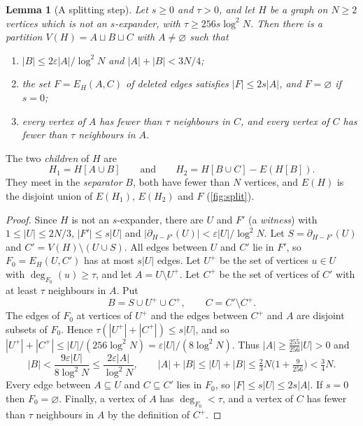 \documentclass[11pt]{article}
\newtheorem{lemma}[theorem]{Lemma}
\theoremstyle{definition}
\theoremstyle{remark}
\numberwithin{equation}{section}
\numberwithin{figure}{section}
\numberwithin{table}{section}
\newcommand{\eps}{\varepsilon}
\newcommand{\NN}{\partial}
\begin{document}
\begin{lemma}[A splitting step]\label{lem:split}
Let $s\ge0$ and $\tau>0$, and let $H$ be a graph on $N\ge2$ vertices which is
not an $s$-expander, with $\tau\ge256s\log^2N$. Then there is a partition
$V(H)=A\sqcup B\sqcup C$ with $A\ne\varnothing$ such that
\begin{enumerate}[label=\textup{(\roman*)},itemsep=1pt]
\item\label{it:split-shape} $|B|\le2\eps|A|/\log^2N$ and $|A|+|B|<3N/4$;
\item\label{it:split-del} the set $F=E_H(A,C)$ of \emph{deleted edges} satisfies
$|F|\le2s|A|$, and $F=\varnothing$ if $s=0$;
\item\label{it:split-thin} every vertex of $A$ has fewer than $\tau$ neighbours in
$C$, and every vertex of $C$ has fewer than $\tau$ neighbours in $A$.
\end{enumerate}
\end{lemma}

The two \emph{children} of $H$ are
\[
H_1=H[A\cup B]\qquad\text{and}\qquad H_2=H[B\cup C]-E(H[B]).
\]
They meet in the \emph{separator} $B$, both have fewer than $N$ vertices, and
$E(H)$ is the disjoint union of $E(H_1)$, $E(H_2)$ and $F$ (\cref{fig:split}).

\begin{proof}
Since $H$ is not an $s$-expander, there are $U$ and $F'$ (a \emph{witness}) with $1\le|U|\le2N/3$,
$|F'|\le s|U|$ and
$|\NN_{H-F'}(U)|<\eps|U|/\log^2N$. Let $S=\NN_{H-F'}(U)$ and
$C'=V(H)\setminus(U\cup S)$. All edges between $U$ and $C'$ lie in $F'$, so
$F_0=E_H(U,C')$ has at most $s|U|$ edges. Let $U^+$ be the set of vertices
$u\in U$ with $\deg_{F_0}(u)\ge\tau$, and let $A=U\setminus U^+$. Let $C^+$ be
the set of vertices of $C'$ with at least $\tau$ neighbours in $A$. Put
\[
B=S\cup U^+\cup C^+,\qquad C=C'\setminus C^+.
\]
The edges of $F_0$ at vertices of $U^+$ and the edges between $C^+$ and $A$ are
disjoint subsets of $F_0$. Hence $\tau(|U^+|+|C^+|)\le s|U|$, and so
$|U^+|+|C^+|\le|U|/(256\log^2N)=\eps|U|/(8\log^2N)$. Thus
$|A|\ge\frac{255}{256}|U|>0$ and
\[
|B|<\frac{9\eps|U|}{8\log^2N}\le\frac{2\eps|A|}{\log^2N},\qquad
|A|+|B|\le|U|+|B|\le\tfrac23N\bigl(1+\tfrac{9}{256}\bigr)<\tfrac34N.
\]
Every edge between $A\subseteq U$ and $C\subseteq C'$ lies in $F_0$, so
$|F|\le s|U|\le2s|A|$. If $s=0$ then $F_0=\varnothing$. Finally, a vertex of
$A$ has $\deg_{F_0}<\tau$, and a vertex of $C$ has fewer than $\tau$ neighbours
in $A$ by the definition of $C^+$.
\end{proof}
\end{document}
